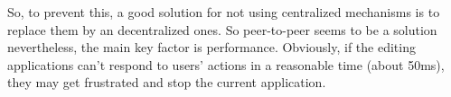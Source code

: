 So, to prevent this, a good solution for not using centralized mechanisms is to replace them by an decentralized ones. So peer-to-peer seems to be a solution nevertheless, the main key factor is performance. Obviously, if the editing applications can't respond to users' actions in a reasonable time (about 50ms), they may get frustrated and stop the current application.